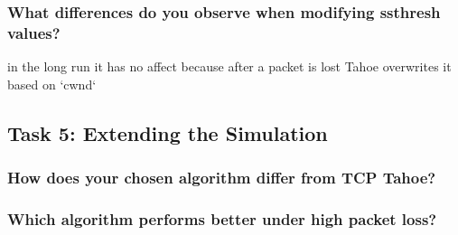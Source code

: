 \documentclass{article}
\begin{document}
\subsubsection{What differences do you observe when modifying ssthresh values?}
in the long run it has no affect because after a packet is lost Tahoe overwrites it based on `cwnd`


\subsection{Task 5: Extending the Simulation}

\subsubsection{How does your chosen algorithm differ from TCP Tahoe?}

\subsubsection{Which algorithm performs better under high packet loss?}
\end{document}

